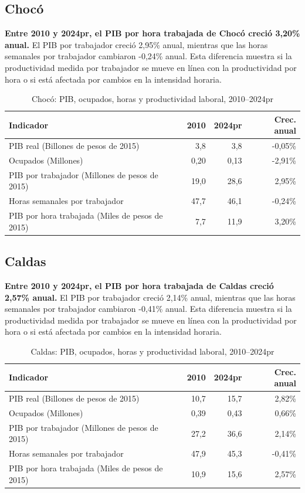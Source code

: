 \subsection{Chocó}
\textbf{Entre 2010 y 2024pr, el PIB por hora trabajada de Chocó creció 3,20\% anual.} El PIB por trabajador creció 2,95\% anual, mientras que las horas semanales por trabajador cambiaron -0,24\% anual. Esta diferencia muestra si la productividad medida por trabajador se mueve en línea con la productividad por hora o si está afectada por cambios en la intensidad horaria.
\begin{table}[H]
\centering
\caption{Chocó: PIB, ocupados, horas y productividad laboral, 2010--2024pr}
\label{tab:departamento_choco_productividad}
\scriptsize
\begin{tabular}{lrrr}
\toprule
Indicador & 2010 & 2024pr & Crec. anual \\
\midrule
PIB real (Billones de pesos de 2015) & 3,8 & 3,8 & -0,05\% \\
Ocupados (Millones) & 0,20 & 0,13 & -2,91\% \\
PIB por trabajador (Millones de pesos de 2015) & 19,0 & 28,6 & 2,95\% \\
Horas semanales por trabajador & 47,7 & 46,1 & -0,24\% \\
PIB por hora trabajada (Miles de pesos de 2015) & 7,7 & 11,9 & 3,20\% \\
\bottomrule
\end{tabular}
\end{table}

\subsection{Caldas}
\textbf{Entre 2010 y 2024pr, el PIB por hora trabajada de Caldas creció 2,57\% anual.} El PIB por trabajador creció 2,14\% anual, mientras que las horas semanales por trabajador cambiaron -0,41\% anual. Esta diferencia muestra si la productividad medida por trabajador se mueve en línea con la productividad por hora o si está afectada por cambios en la intensidad horaria.
\begin{table}[H]
\centering
\caption{Caldas: PIB, ocupados, horas y productividad laboral, 2010--2024pr}
\label{tab:departamento_caldas_productividad}
\scriptsize
\begin{tabular}{lrrr}
\toprule
Indicador & 2010 & 2024pr & Crec. anual \\
\midrule
PIB real (Billones de pesos de 2015) & 10,7 & 15,7 & 2,82\% \\
Ocupados (Millones) & 0,39 & 0,43 & 0,66\% \\
PIB por trabajador (Millones de pesos de 2015) & 27,2 & 36,6 & 2,14\% \\
Horas semanales por trabajador & 47,9 & 45,3 & -0,41\% \\
PIB por hora trabajada (Miles de pesos de 2015) & 10,9 & 15,6 & 2,57\% \\
\bottomrule
\end{tabular}
\end{table}

